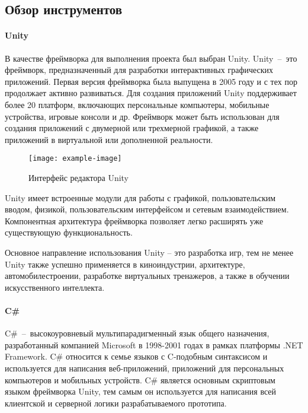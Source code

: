 ﻿\subsection{Обзор инструментов}

\paragraph{Unity}

В качестве фреймворка для выполнения проекта был выбран Unity.
Unity~--~это фреймворк, предназначенный для разработки интерактивных графических приложений.%
\cite{DocUnity}
Первая версия фреймворка была выпущена в 2005 году
и с тех пор продолжает активно развиваться.
Для создания приложений Unity поддерживает более 20 платформ,
включающих персональные компьютеры, мобильные устройства, игровые консоли и др.
Фреймворк может быть использован для создания приложений
с двумерной или трехмерной графикой, а также приложений
в виртуальной или дополненной реальности.

\begin{figure}[h]
    \texttt{[image: example-image]}
    \caption{Интерфейс редактора Unity}
    \label{figure:UnityInterface}
\end{figure}

Unity имеет встроенные модули для работы с
графикой, пользовательским вводом, физикой,
пользовательским интерфейсом и сетевым взаимодействием.
Компонентная архитектура фреймворка позволяет
легко расширять уже существующую функциональность.

Основное направление использования Unity -- это разработка игр,
тем не менее Unity также успешно применяется в киноиндустрии,\cite{UnityInFilmmaking}
архитектуре, автомобилестроении,\cite{UnityInAutomotive}
разработке виртуальных тренажеров, а также в
обучении искусственного интеллекта.\cite{UnityInAI}

\paragraph{C\#}
C\#~--~высокоуровневый мультипарадигменный язык общего назначения,
разработанный компанией Microsoft в 1998-2001 годах
в рамках платформы .NET Framework.
C\# относится к семье языков с C-подобным синтаксисом и
используется для написания веб-приложений,
приложений для персональных компьютеров и мобильных устройств.
\cite{DocCSharp}
C\# является основным скриптовым языком фреймворка Unity,
тем самым он используется для написания всей
клиентской и серверной логики разрабатываемого прототипа.

